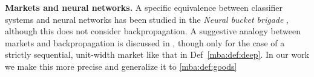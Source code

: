\textbf{Markets and neural networks.} A specific equivalence between classifier systems and neural networks has been studied in the \emph{Neural bucket brigade} \citep{davisMappingClassifierSystems1988, schmidhuberLocalLearningAlgorithm1989}, although this does not consider backpropagation. A suggestive analogy between markets and backpropagation is discussed in \citet{wentworthCompetitiveMarketsDistributed2018}, though only for the case of a strictly sequential, unit-width market like that in Def~\ref{mba:def:deep}. In our work we make this more precise and generalize it to \ref{mba:def:goods}
